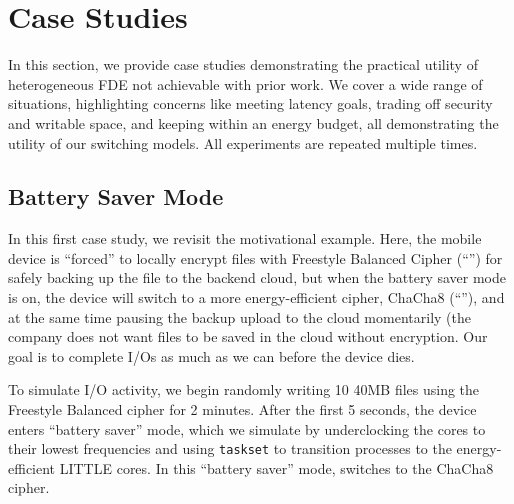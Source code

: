 \section{Case Studies}\label{sec:usecases}

In this section, we provide \numCases case studies demonstrating the practical
utility of heterogeneous FDE not achievable with prior work. We cover a wide
range of situations, highlighting concerns like meeting latency goals, trading
off security and writable space, and keeping within an energy budget, all
demonstrating the utility of our switching models. All experiments are repeated
multiple times.


\subsection{Battery Saver Mode}\label{subsec:usecase-battery}

In this first case study, we revisit the motivational example. Here, the mobile
device is ``forced'' to locally encrypt files with Freestyle Balanced Cipher
(``\cone'') for safely backing up the file to the backend cloud, but when the
battery saver mode is on, the device will switch to a more energy-efficient
cipher, ChaCha8 (``\ctwo''), and at the same time pausing the backup upload to
the cloud momentarily (\eg the company does not want files to be saved in the
cloud without \cone encryption. Our goal is to complete I/Os as much as we can
before the device dies.

To simulate I/O activity, we begin randomly writing 10 40MB files using the
Freestyle Balanced cipher for 2 minutes. After the first 5 seconds, the device
enters ``battery saver'' mode, which we simulate by underclocking the cores to
their lowest frequencies and using \texttt{taskset} to transition \sys processes
to the energy-efficient LITTLE cores. In this ``battery saver'' mode, \sys
switches to the ChaCha8 cipher.



